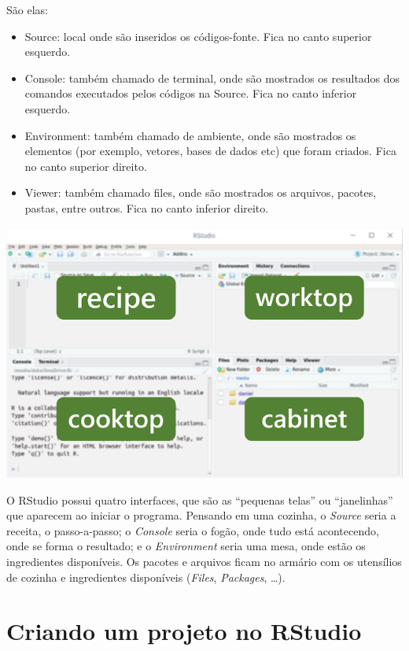 \documentclass[
  10pt,
  brazil,
  a4paper,
  twoside, notitlepage, openright]{book}
\providecommand{\tightlist}{%
  \setlength{\itemsep}{0pt}\setlength{\parskip}{0pt}}
\begin{document}
São elas:

\begin{itemize}
\tightlist
\item
  Source: local onde são inseridos os códigos-fonte. Fica no canto superior esquerdo.
\item
  Console: também chamado de terminal, onde são mostrados os resultados dos comandos executados pelos códigos na Source. Fica no canto inferior esquerdo.
\item
  Environment: também chamado de ambiente, onde são mostrados os elementos (por exemplo, vetores, bases de dados etc) que foram criados. Fica no canto superior direito.
\item
  Viewer: também chamado files, onde são mostrados os arquivos, pacotes, pastas, entre outros. Fica no canto inferior direito.
\end{itemize}

\includegraphics[width=11.81in]{img/cozinha}

O RStudio possui quatro interfaces, que são as ``pequenas telas'' ou ``janelinhas'' que aparecem ao iniciar o programa. Pensando em uma cozinha, o \emph{Source} seria a receita, o passo-a-passo; o \emph{Console} seria o fogão, onde tudo está acontecendo, onde se forma o resultado; e o \emph{Environment} seria uma mesa, onde estão os ingredientes disponíveis. Os pacotes e arquivos ficam no armário com os utensílios de cozinha e ingredientes disponíveis (\emph{Files}, \emph{Packages}, \ldots).

\hypertarget{criando-um-projeto-no-rstudio}{%
\section{Criando um projeto no RStudio}\label{criando-um-projeto-no-rstudio}}
\end{document}
